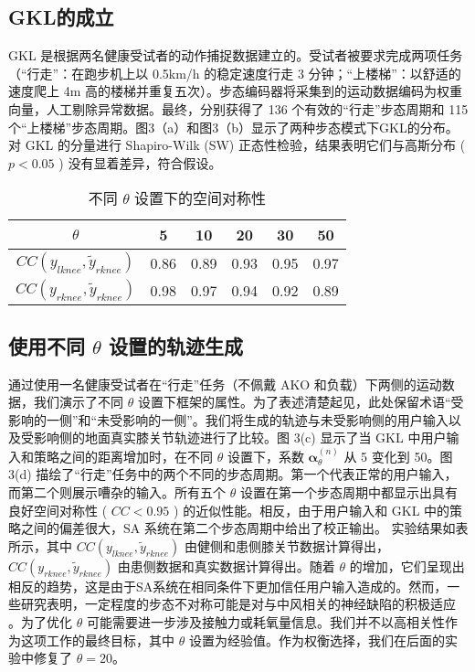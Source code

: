 \subsection{GKL的成立  }    GKL 是根据两名健康受试者的动作捕捉数据建立的。受试者被要求完成两项任务（“行走”：在跑步机上以 0.5km/h 的稳定速度行走 3 分钟；“上楼梯”：以舒适的速度爬上 4m 高的楼梯并重复五次）。步态编码器将采集到的运动数据编码为权重向量，人工剔除异常数据。最终，分别获得了 136 个有效的“行走”步态周期和 115 个“上楼梯”步态周期。图3（a）和图3（b）显示了两种步态模式下GKL的分布。对 GKL 的分量进行 Shapiro-Wilk (SW) 正态性检验，结果表明它们与高斯分布 (    $p<0.05$    ) 没有显着差异，符合假设。  

\begin{table}[!t]
    \centering
    \caption{不同    $\theta $    设置下的空间对称性    \label{tab:table1}     }
    \begin{tabular}{cccccc}
    \toprule
            $\theta $         & 5 & 10 & 20 & 30 & 50  \\ 
    \midrule
            ${CC}({y_{lknee}},{\tilde y_{rknee}})$         & 0.86	&0.89	&0.93	&0.95	&0.97  \\ 
            ${CC}({y_{rknee}},{\tilde y_{rknee}})$         & 0.98 &0.97	&0.94	&0.92	&0.89  \\ 
    \bottomrule
    \end{tabular}
\end{table}   

\subsection{使用不同    $\theta $    设置的轨迹生成  }    通过使用一名健康受试者在“行走”任务（不佩戴 AKO 和负载）下两侧的运动数据，我们演示了不同    $\theta $    设置下框架的属性。为了表述清楚起见，此处保留术语“受影响的一侧”和“未受影响的一侧”。我们将生成的轨迹与未受影响侧的用户输入以及受影响侧的地面真实膝关节轨迹进行了比较。图 3(c) 显示了当 GKL 中用户输入和策略之间的距离增加时，在不同    $\theta $    设置下，系数    $\pmb{\alpha }_\theta ^{(n)}$    从 5 变化到 50。图 3(d) 描绘了“行走”任务中的两个不同的步态周期。第一个代表正常的用户输入，而第二个则展示嘈杂的输入。所有五个    $\theta $    设置在第一个步态周期中都显示出具有良好空间对称性 (    $CC<0.95$    ) 的近似性能。相反，由于用户输入和 GKL 中的策略之间的偏差很大，SA 系统在第二个步态周期中给出了校正输出。
实验结果如表    \uppercase       \expandafter{}    所示，其中    ${CC}({y_{lknee}},{\tilde y_{rknee}})$    由健侧和患侧膝关节数据计算得出，   ${CC}({y_{rknee}},{\tilde y_{rknee}})$    由患侧数据和真实数据计算得出。随着   $\theta $   的增加，它们呈现出相反的趋势，这是由于SA系统在相同条件下更加信任用户输入造成的。然而，一些研究表明，一定程度的步态不对称可能是对与中风相关的神经缺陷的积极适应    \cite{balabanGaitDisturbancesPatients2014}    。为了优化    $\theta $    可能需要进一步涉及接触力或耗氧量信息。我们并不以高相关性作为这项工作的最终目标，其中    $\theta $    设置为经验值。作为权衡选择，我们在后面的实验中修复了    $\theta  = 20$。

